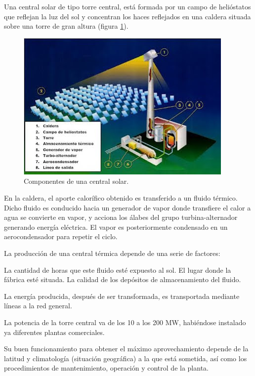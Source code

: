 Una central solar de tipo torre central, está formada por un campo de helióstatos que reflejan la luz del sol y concentran los haces reflejados en una caldera situada sobre una torre de gran altura (figura \ref{fig:FotosPaginasWebHeliostatos/unnamed(2).jpg}).

\begin{figure}[h!]
  	\centering
	\includegraphics[scale=1]{FotosPaginasWebHeliostatos/unnamed(2).jpg}
	\caption{Componentes de una central solar.
	\label{fig:FotosPaginasWebHeliostatos/unnamed(2).jpg}}
\end{figure}

En la caldera, el aporte calorífico obtenido es transferido a un fluido térmico. Dicho fluido es conducido hacia un generador de vapor donde transfiere el calor a agua se convierte en vapor, y acciona los álabes del grupo turbina-alternador generando energía eléctrica. El vapor es posteriormente condensado en un aerocondensador para repetir el ciclo.

La producción de una central térmica depende de una serie de factores:

La cantidad de horas que este fluido esté expuesto al sol.
El lugar donde la fábrica esté situada.
La calidad de los depósitos de almacenamiento del fluido.

La energía producida, después de ser transformada, es transportada mediante líneas a la red general. \cite{LuciaRinconWebSite}

La potencia de la torre central va de los 10 a los 200 MW, habiéndose instalado ya diferentes plantas comerciales.

Su buen funcionamiento para obtener el máximo aprovechamiento depende de la latitud y climatología (situación geográfica) a la que está sometida, así como los procedimientos de mantenimiento, operación y control de la planta.

